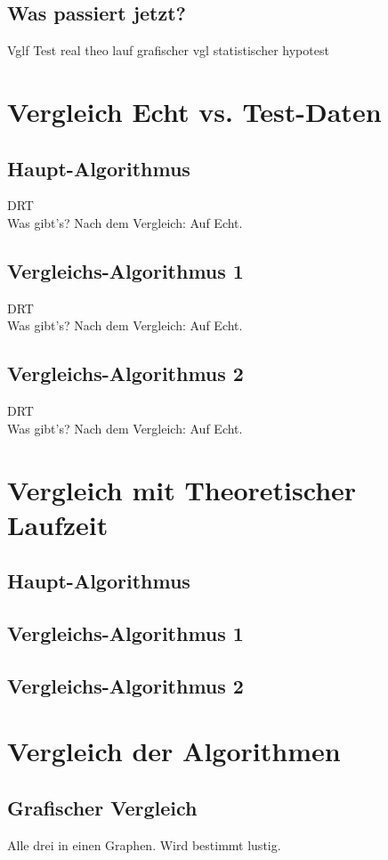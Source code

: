 \documentclass[
10pt, %
a4paper, %
oneside, %
headinclude,footinclude, %
BCOR5mm, %
]{scrartcl}
\begin{document}
 \subsection{Was passiert jetzt?}

Vglf Test real
theo lauf
grafischer vgl
statistischer hypotest


\section{Vergleich Echt vs. Test-Daten}
\subsection{Haupt-Algorithmus}
DRT\\
Was gibt's?
Nach dem Vergleich: Auf Echt.

\subsection{Vergleichs-Algorithmus 1}
DRT\\
Was gibt's?
Nach dem Vergleich: Auf Echt.

\subsection{Vergleichs-Algorithmus 2}
DRT\\
Was gibt's?
Nach dem Vergleich: Auf Echt.

\section{Vergleich mit Theoretischer Laufzeit}
\subsection{Haupt-Algorithmus}
\subsection{Vergleichs-Algorithmus 1}
\subsection{Vergleichs-Algorithmus 2}

\section{Vergleich der Algorithmen}
\subsection{Grafischer Vergleich}
Alle drei in einen Graphen. Wird bestimmt lustig.
\end{document}
